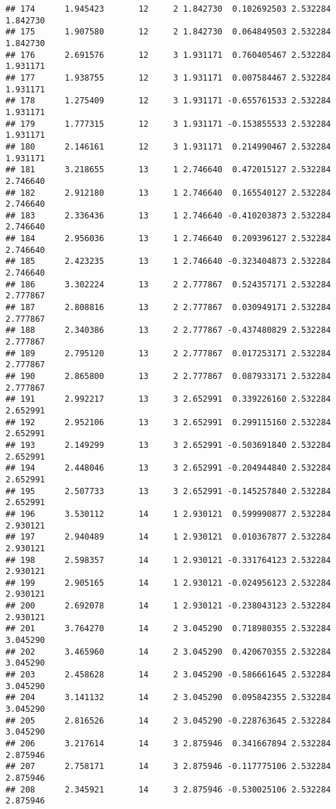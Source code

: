 \documentclass[]{book}
\theoremstyle{definition}
\theoremstyle{definition}
\theoremstyle{definition}
\theoremstyle{remark}
\begin{document}
\begin{verbatim}
## 174      1.945423       12     2 1.842730  0.102692503 2.532284 1.842730
## 175      1.907580       12     2 1.842730  0.064849503 2.532284 1.842730
## 176      2.691576       12     3 1.931171  0.760405467 2.532284 1.931171
## 177      1.938755       12     3 1.931171  0.007584467 2.532284 1.931171
## 178      1.275409       12     3 1.931171 -0.655761533 2.532284 1.931171
## 179      1.777315       12     3 1.931171 -0.153855533 2.532284 1.931171
## 180      2.146161       12     3 1.931171  0.214990467 2.532284 1.931171
## 181      3.218655       13     1 2.746640  0.472015127 2.532284 2.746640
## 182      2.912180       13     1 2.746640  0.165540127 2.532284 2.746640
## 183      2.336436       13     1 2.746640 -0.410203873 2.532284 2.746640
## 184      2.956036       13     1 2.746640  0.209396127 2.532284 2.746640
## 185      2.423235       13     1 2.746640 -0.323404873 2.532284 2.746640
## 186      3.302224       13     2 2.777867  0.524357171 2.532284 2.777867
## 187      2.808816       13     2 2.777867  0.030949171 2.532284 2.777867
## 188      2.340386       13     2 2.777867 -0.437480829 2.532284 2.777867
## 189      2.795120       13     2 2.777867  0.017253171 2.532284 2.777867
## 190      2.865800       13     2 2.777867  0.087933171 2.532284 2.777867
## 191      2.992217       13     3 2.652991  0.339226160 2.532284 2.652991
## 192      2.952106       13     3 2.652991  0.299115160 2.532284 2.652991
## 193      2.149299       13     3 2.652991 -0.503691840 2.532284 2.652991
## 194      2.448046       13     3 2.652991 -0.204944840 2.532284 2.652991
## 195      2.507733       13     3 2.652991 -0.145257840 2.532284 2.652991
## 196      3.530112       14     1 2.930121  0.599990877 2.532284 2.930121
## 197      2.940489       14     1 2.930121  0.010367877 2.532284 2.930121
## 198      2.598357       14     1 2.930121 -0.331764123 2.532284 2.930121
## 199      2.905165       14     1 2.930121 -0.024956123 2.532284 2.930121
## 200      2.692078       14     1 2.930121 -0.238043123 2.532284 2.930121
## 201      3.764270       14     2 3.045290  0.718980355 2.532284 3.045290
## 202      3.465960       14     2 3.045290  0.420670355 2.532284 3.045290
## 203      2.458628       14     2 3.045290 -0.586661645 2.532284 3.045290
## 204      3.141132       14     2 3.045290  0.095842355 2.532284 3.045290
## 205      2.816526       14     2 3.045290 -0.228763645 2.532284 3.045290
## 206      3.217614       14     3 2.875946  0.341667894 2.532284 2.875946
## 207      2.758171       14     3 2.875946 -0.117775106 2.532284 2.875946
## 208      2.345921       14     3 2.875946 -0.530025106 2.532284 2.875946

\end{verbatim}
\end{document}
